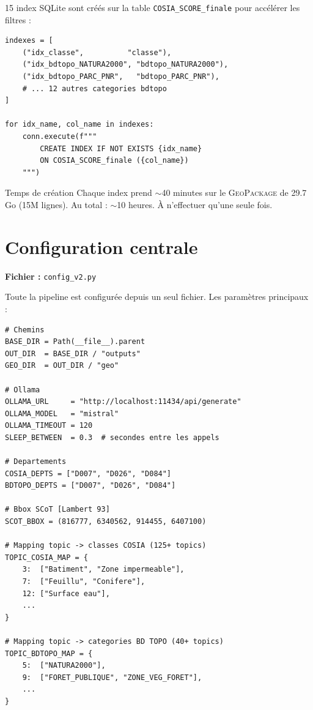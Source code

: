 \documentclass[11pt,a4paper]{report}
\newcommand{\code}[1]{\texttt{\small #1}}
\newcommand{\gpkg}{\textsc{GeoPackage}}
\begin{document}
15 index SQLite sont créés sur la table \code{COSIA\_SCORE\_finale} pour accélérer les filtres :

\begin{lstlisting}[language=Python3, caption={Création des index SQLite}]
indexes = [
    ("idx_classe",          "classe"),
    ("idx_bdtopo_NATURA2000", "bdtopo_NATURA2000"),
    ("idx_bdtopo_PARC_PNR",   "bdtopo_PARC_PNR"),
    # ... 12 autres categories bdtopo
]

for idx_name, col_name in indexes:
    conn.execute(f"""
        CREATE INDEX IF NOT EXISTS {idx_name}
        ON COSIA_SCORE_finale ({col_name})
    """)
\end{lstlisting}

\begin{warnbox}{Temps de création}
Chaque index prend $\sim$40 minutes sur le \gpkg{} de 29.7 Go (15M lignes). Au total : $\sim$10 heures. À n'effectuer qu'une seule fois.
\end{warnbox}

\section{Configuration centrale}

\textbf{Fichier :} \code{config\_v2.py}

Toute la pipeline est configurée depuis un seul fichier. Les paramètres principaux :

\begin{lstlisting}[language=Python3, caption={Extraits de config\_v2.py}]
# Chemins
BASE_DIR = Path(__file__).parent
OUT_DIR  = BASE_DIR / "outputs"
GEO_DIR  = OUT_DIR / "geo"

# Ollama
OLLAMA_URL     = "http://localhost:11434/api/generate"
OLLAMA_MODEL   = "mistral"
OLLAMA_TIMEOUT = 120
SLEEP_BETWEEN  = 0.3  # secondes entre les appels

# Departements
COSIA_DEPTS = ["D007", "D026", "D084"]
BDTOPO_DEPTS = ["D007", "D026", "D084"]

# Bbox SCoT [Lambert 93]
SCOT_BBOX = (816777, 6340562, 914455, 6407100)

# Mapping topic -> classes COSIA (125+ topics)
TOPIC_COSIA_MAP = {
    3:  ["Batiment", "Zone impermeable"],
    7:  ["Feuillu", "Conifere"],
    12: ["Surface eau"],
    ...
}

# Mapping topic -> categories BD TOPO (40+ topics)
TOPIC_BDTOPO_MAP = {
    5:  ["NATURA2000"],
    9:  ["FORET_PUBLIQUE", "ZONE_VEG_FORET"],
    ...
}
\end{lstlisting}
\end{document}
